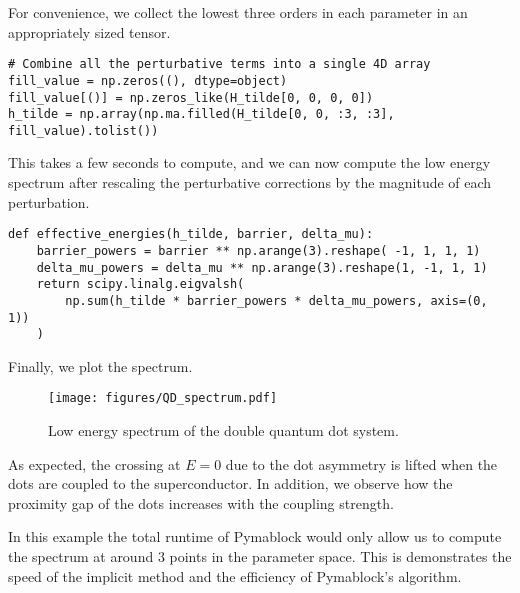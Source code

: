 For convenience, we collect the lowest three orders in each parameter in an
appropriately sized tensor.
%
\begin{verbatim}
# Combine all the perturbative terms into a single 4D array
fill_value = np.zeros((), dtype=object)
fill_value[()] = np.zeros_like(H_tilde[0, 0, 0, 0])
h_tilde = np.array(np.ma.filled(H_tilde[0, 0, :3, :3], fill_value).tolist())
\end{verbatim}
%
This takes a few seconds to compute, and we can now compute the low energy
spectrum after rescaling the perturbative corrections by the magnitude of each
perturbation.
%
\begin{verbatim}
def effective_energies(h_tilde, barrier, delta_mu):
    barrier_powers = barrier ** np.arange(3).reshape( -1, 1, 1, 1)
    delta_mu_powers = delta_mu ** np.arange(3).reshape(1, -1, 1, 1)
    return scipy.linalg.eigvalsh(
        np.sum(h_tilde * barrier_powers * delta_mu_powers, axis=(0, 1))
    )
\end{verbatim}
%
Finally, we plot the spectrum.
%
\begin{figure}[h!]
\centering
\texttt{[image: figures/QD\_spectrum.pdf]}
\caption{Low energy spectrum of the double quantum dot system.
}
\label{fig:QD_spectrum}
\end{figure}
%
As expected, the crossing at $E=0$ due to the dot asymmetry is lifted when the
dots are coupled to the superconductor.
In addition, we observe how the proximity gap of the dots increases with the
coupling strength.

In this example the total runtime of Pymablock would only allow us to compute
the spectrum at around 3 points in the parameter space.
This is demonstrates the speed of the implicit method and the efficiency of
Pymablock's algorithm.
